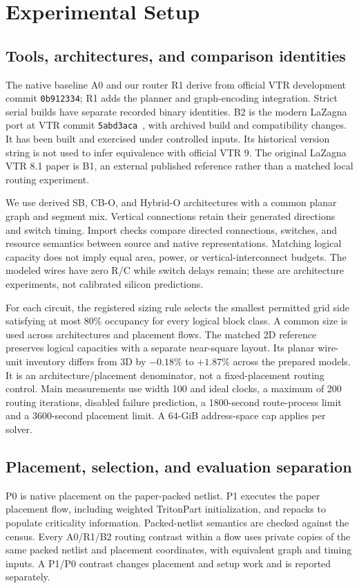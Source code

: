 \documentclass[conference,10pt]{IEEEtran}
\begin{document}
\clearpage



\section{Experimental Setup}
\subsection{Tools, architectures, and comparison identities}
The native baseline A0 and our router R1 derive from official VTR development commit \texttt{0b912334}; R1 adds the planner and graph-encoding integration. Strict serial builds have separate recorded binary identities. B2 is the modern LaZagna port at VTR commit \texttt{5abd3aca}~\cite{modern}, with archived build and compatibility changes. It has been built and exercised under controlled inputs. Its historical version string is not used to infer equivalence with official VTR 9. The original LaZagna VTR 8.1 paper is B1, an external published reference rather than a matched local routing experiment.

We use derived SB, CB-O, and Hybrid-O architectures with a common planar graph and segment mix. Vertical connections retain their generated directions and switch timing. Import checks compare directed connections, switches, and resource semantics between source and native representations. Matching logical capacity does not imply equal area, power, or vertical-interconnect budgets. The modeled wires have zero R/C while switch delays remain; these are architecture experiments, not calibrated silicon predictions.

For each circuit, the registered sizing rule selects the smallest permitted grid side satisfying at most 80\% occupancy for every logical block class. A common size is used across architectures and placement flows. The matched 2D reference preserves logical capacities with a separate near-square layout. Its planar wire-unit inventory differs from 3D by $-0.18\%$ to $+1.87\%$ across the prepared models. It is an architecture/placement denominator, not a fixed-placement routing control. Main measurements use width 100 and ideal clocks, a maximum of 200 routing iterations, disabled failure prediction, a 1800-second route-process limit and a 3600-second placement limit. A 64-GiB address-space cap applies per solver.

\subsection{Placement, selection, and evaluation separation}
P0 is native placement on the paper-packed netlist. P1 executes the paper placement flow, including weighted TritonPart initialization, and repacks to populate criticality information. Packed-netlist semantics are checked against the census. Every A0/R1/B2 routing contrast within a flow uses private copies of the same packed netlist and placement coordinates, with equivalent graph and timing inputs. A P1/P0 contrast changes placement and setup work and is reported separately.
\end{document}
